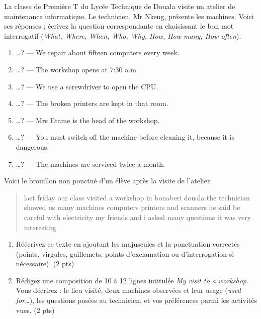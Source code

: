 \documentclass[11pt]{article}
\begin{document}
\begin{exercice}
La classe de Première T du Lycée Technique de Douala visite un atelier de maintenance informatique. Le technicien, Mr Nkeng, présente les machines. Voici ses réponses ; écrivez la question correspondante en choisissant le bon mot interrogatif (\emph{What, Where, When, Who, Why, How, How many, How often}).
\begin{enumerate}
\item \ldots ? --- We repair about fifteen computers every week.
\item \ldots ? --- The workshop opens at 7:30 a.m.
\item \ldots ? --- We use a screwdriver to open the CPU.
\item \ldots ? --- The broken printers are kept in that room.
\item \ldots ? --- Mrs Etame is the head of the workshop.
\item \ldots ? --- You must switch off the machine before cleaning it, because it is dangerous.
\item \ldots ? --- The machines are serviced twice a month.
\end{enumerate}
\end{exercice}

\begin{exercice}
Voici le brouillon non ponctué d'un élève après la visite de l'atelier.
\begin{quote}
\og last friday our class visited a workshop in bonaberi douala the technician showed us many machines computers printers and scanners he said be careful with electricity my friends and i asked many questions it was very interesting \fg{}
\end{quote}
\begin{enumerate}
\item Réécrivez ce texte en ajoutant les majuscules et la ponctuation correctes (points, virgules, guillemets, points d'exclamation ou d'interrogation si nécessaire). \hfill (2 pts)
\item Rédigez une composition de 10 à 12 lignes intitulée \emph{My visit to a workshop}. Vous décrirez : le lieu visité, deux machines observées et leur usage (\emph{used for\ldots}), les questions posées au technicien, et vos préférences parmi les activités vues. \hfill (2 pts)
\end{enumerate}
\end{exercice}
\end{document}
